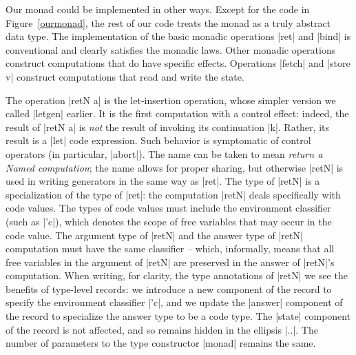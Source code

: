 \documentclass{elsart}
\begin{document}
Our monad could be implemented in other ways. Except for the code in
Figure~\ref{ourmonad}, the rest of our code treats the monad as a
truly abstract data type. The implementation of the basic monadic
operations |ret| and |bind| is conventional and clearly satisfies the
monadic laws. Other monadic operations construct computations that do
have specific effects.  Operations |fetch| and |store v| construct
computations that read and write the state.

The operation |retN a| is the let-insertion operation, whose simpler
version we called |letgen| earlier. It is the first computation with a
control effect: indeed, the result of |retN a| is \emph{not} the
result of invoking its continuation |k|. Rather, its result is a |let|
code expression. Such behavior is symptomatic of control operators (in
particular, |abort|).  The name can be taken to mean \emph{return a
Named computation}; the name allows for proper sharing, but
otherwise |retN| is used in writing generators in the same way as
|ret|. The type of |retN| is a specialization of the type of |ret|:
the computation |retN| deals specifically with code values. The types
of code values must include the environment classifier 
(such as |'c|), which denotes
the scope of free variables that may occur in the code value. The
argument type of |retN| and the answer type of |retN| computation must
have the same classifier -- which, informally, means that all free
variables in the argument of |retN| are preserved in the answer of
|retN|'s computation. When writing, for clarity, the type annotations
of |retN| we see the benefits of type-level records: we introduce a
new component of the record to specify the environment classifier
|'c|, and we update the |answer| component of the record to specialize
the answer type to be a code type. The |state| component of the
record is not affected, and so remains hidden in the ellipsis |..|. The
number of parameters to the type constructor |monad| remains the same.
\end{document}
